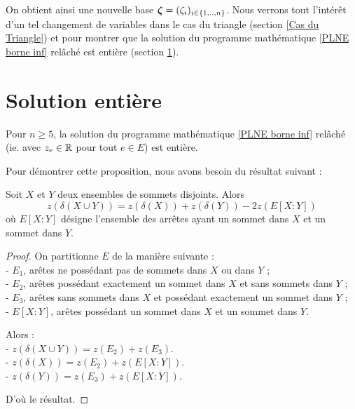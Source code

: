 On obtient ainsi une nouvelle base $\boldsymbol{\zeta} = (\zeta_i)_{i \in \{1,..,n\}}$. Nous verrons tout l'intérêt d'un tel changement de variables dans le cas du triangle (section \ref{Cas du Triangle}) et pour montrer que la solution du programme mathématique \eqref{PLNE borne inf} relâché est entière (section \ref{Section solution entiere}).


\section{Solution entière}
\label{Section solution entiere}

\begin{prop} \label{Solution entière}
Pour $n \ge 5$, la solution du programme mathématique \eqref{PLNE borne inf} relâché (ie. avec $z_e \in \mathbb{R}$ pour tout $e \in E$) est entière.
\end{prop}

Pour démontrer cette proposition, nous avons besoin du résultat suivant :

\begin{prop} \label{cout union}
Soit $X$ et $Y$ deux ensembles de sommets disjoints. Alors
\[z(\delta(X \cup Y)) = z(\delta(X)) + z(\delta(Y)) - 2 z(E[X:Y])\]
où $E[X:Y]$ désigne l'ensemble des arrêtes ayant un sommet dans $X$ et un sommet dans $Y$.
\end{prop}

\begin{proof}
On partitionne $E$ de la manière suivante :\\
- $E_1$, arêtes ne possédant pas de sommets dans $X$ ou dans $Y$ ;\\
- $E_2$, arêtes possédant exactement un sommet dans $X$ et sans sommets dans $Y$ ;\\
- $E_3$, arêtes sans sommets dans $X$ et possédant exactement un sommet dans $Y$ ;\\
- $E[X:Y]$, arêtes possédant un sommet dans $X$ et un sommet dans $Y$.

Alors :\\
- $z(\delta(X \cup Y)) = z(E_2) + z(E_3)$.\\
- $z(\delta(X)) = z(E_2) + z(E[X:Y])$.\\
- $z(\delta(Y)) = z(E_3) + z(E[X:Y])$.

D'où le résultat.
\end{proof}

